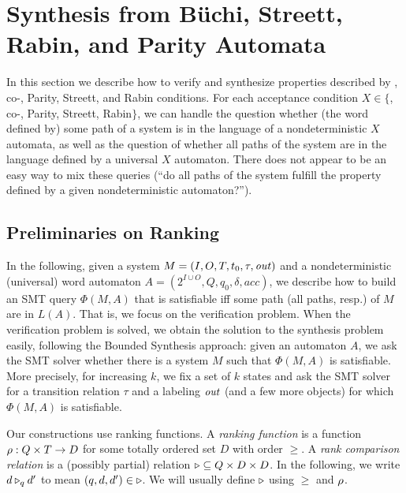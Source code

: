 \section{Synthesis from B\"uchi, Streett, Rabin, and Parity Automata}\label{bosy:synt-from-word-automata}

In this section we describe how to verify and synthesize
properties described by \buchi, co-\buchi, Parity, Streett, and Rabin
conditions. 
For each acceptance condition $X \in \{$\buchi, co-\buchi,
Parity, Streett, Rabin$\}$, we can handle the question whether (the word defined
by) some path of a system is in the language of a nondeterministic $X$
automata, as well as the question of whether all paths of the system
are in the language defined by a universal $X$ automaton. There does
not appear to be an easy way to mix these queries (``do all paths of
the system fulfill the property defined by a given nondeterministic
automaton?'').


\subsection{Preliminaries on Ranking}\label{sec:ranking}

In the following, given a system $M = (I,O,T,t_0,\tau,\mathit{out})$ and
a nondeterministic (universal) word automaton
$A = (2^{I\cup O}, Q, q_0, \delta, acc)$,
we describe how to build an SMT query $\Phi(M,A)$
that is satisfiable iff some path (all paths, resp.) of $M$ are in $L(A)$.
That is, we focus on the verification problem.
When the verification problem is solved, we obtain the solution to the
synthesis problem easily, following the Bounded Synthesis approach:
given an automaton $A$, we ask the SMT solver whether there is a
system $M$ such that $\Phi(M,A)$ is satisfiable.
More precisely, for increasing $k$,
we fix a set of $k$ states and ask the SMT solver for
a transition relation $\tau$ and a labeling $\mathit{out}$ (and a few more objects)
for which $\Phi(M,A)$ is satisfiable.


Our constructions use ranking functions.
A \emph{ranking function} is a function $\rho: Q\times T \to D$
for some totally ordered set $D$ with order $\geq$.
A \emph{rank comparison relation} is a (possibly partial) relation
$\triangleright \subseteq Q \times D \times D$.
In the following,
we write
$d \triangleright_q d'$
to mean
$(q,d,d') \in \triangleright$.
We will usually define $\triangleright$ using $\geq$ and $\rho$.

